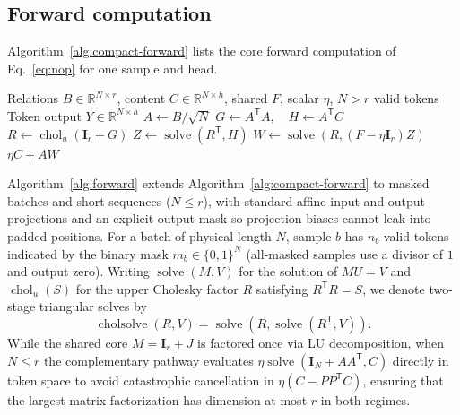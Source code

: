 \documentclass[10pt,twocolumn]{article}
\newcommand{\R}{\mathbb{R}}
\newcommand{\I}{\mathbf{I}}
\newcommand{\T}{\mathsf{T}}
\newcommand{\Solve}{\operatorname{solve}}
\newcommand{\Chol}{\operatorname{chol}_{u}}
\newcommand{\CholSolve}{\operatorname{cholsolve}}
\begin{document}
\subsection{Forward computation}
\label{app:forward}

Algorithm~\ref{alg:compact-forward} lists the core forward computation of
Eq.~\eqref{eq:nop} for one sample and head.

\begin{algorithm}[H]
\caption{MemSolve: compact forward computation (one sample and head)}
\label{alg:compact-forward}
\begin{algorithmic}[1]
\Require Relations $B\in\R^{N\times r}$, content $C\in\R^{N\times h}$,
 shared $F$, scalar $\eta$, $N>r$ valid tokens
\Ensure Token output $Y\in\R^{N\times h}$
\State $A\gets B/\sqrt N$
\State $G\gets A^\T A,\quad H\gets A^\T C$ 
\State $R\gets\Chol(\I_r+G)$ \Comment{$R^\T R=\I_r+G$}
\State $Z\gets\Solve(R^\T,H)$
\State $W\gets\Solve(R,(F-\eta\I_r)Z)$
\State \Return $\eta C+AW$ 
\end{algorithmic}
\end{algorithm}

Algorithm~\ref{alg:forward} extends Algorithm~\ref{alg:compact-forward} to
masked batches and short sequences ($N\le r$), with standard affine input and
output projections and an explicit output mask so projection biases cannot
leak into padded positions.
For a batch of physical length $N$, sample $b$ has $n_b$ valid tokens
indicated by the binary mask $m_b\in\{0,1\}^N$ (all-masked samples use a
divisor of $1$ and output zero).
Writing $\Solve(M,V)$ for the solution of $MU=V$ and $\Chol(S)$ for the upper
Cholesky factor $R$ satisfying $R^\T R=S$, we denote two-stage triangular
solves by
\begin{equation}
 \CholSolve(R,V)=\Solve\!\left(R,\Solve(R^\T,V)\right).
 \label{eq:cholsolve}
\end{equation}
While the shared core $M=\I_r+J$ is factored once via LU decomposition, when
$N\le r$ the complementary pathway evaluates $\eta\Solve(\I_N+AA^\T,C)$
directly in token space to avoid catastrophic cancellation in
$\eta(C-PP^\T C)$, ensuring that the largest matrix factorization has
dimension at most $r$ in both regimes.
\end{document}
